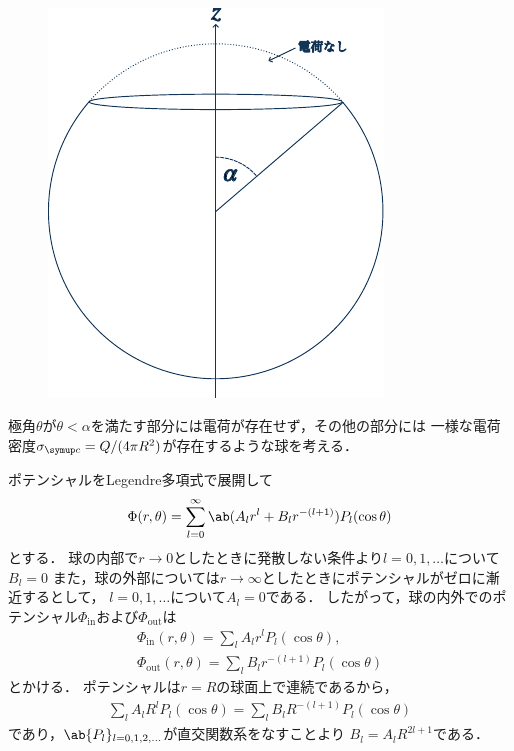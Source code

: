 \hrulefill\\
\begin{figure}
  \centering%
  \includegraphics[width=\linewidth]{fig/Jackson3-2.pdf}%
\end{figure}%
極角$\theta$が$\theta < \alpha$を満たす部分には電荷が存在せず，その他の部分には
一様な電荷密度$\sigma_{\mr{c}} = Q /(4\pi R^2)$が存在するような球を考える．

ポテンシャルをLegendre多項式で展開して
\begin{gather}%
  \Phi(r,\theta) = \sum_{l=0}^\infty \ab(A_l r^l + B_l r^{-(l+1)}) P_l(\cos\theta)
\end{gather}%
とする．
球の内部で$r\to 0$としたときに発散しない条件より$l = 0, 1, \ldots$について$B_l = 0$
また，球の外部については$r \to \infty$としたときにポテンシャルがゼロに漸近するとして，
$l = 0, 1, \ldots$について$A_l = 0$である．
したがって，球の内外でのポテンシャル$\Phi_{\text{in}}$および$\Phi_{\text{out}}$は
\begin{gather}%
  \Phi_{\text{in}}(r,\theta) = \sum_{l} A_l r^l P_l(\cos\theta),\\
  \Phi_{\text{out}}(r,\theta) = \sum_{l} B_l r^{-(l+1)} P_l(\cos\theta)
\end{gather}%
とかける．
ポテンシャルは$r= R$の球面上で連続であるから，
\begin{gather}%
  \sum_l A_l R^l P_l(\cos\theta) = \sum_l B_l R^{-(l+1)}P_l(\cos\theta)
\end{gather}%
であり，$\ab\{P_l\}_{l=0,1,2,\ldots}$が直交関数系をなすことより
$B_l = A_l R^{2l+1}$である．

